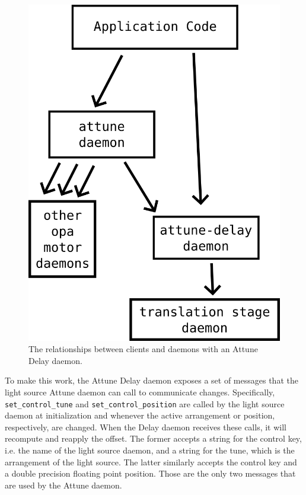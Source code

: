 \begin{figure}
\includegraphics[width=5in]{active_correction/images/attune_delay_flow}
\caption[Attune Delay Information Flow]{The relationships between clients and daemons with an Attune Delay daemon.}
\label{act_corr:fig:attune_delay_flow}
\end{figure}

To make this work, the Attune Delay daemon exposes a set of messages that the light source Attune daemon can call to communicate changes.
Specifically, \texttt{set\_control\_tune} and \texttt{set\_control\_position} are called by the light source daemon at initialization and whenever the active arrangement or position, respectively, are changed.
When the Delay daemon receives these calls, it will recompute and reapply the offset.
The former accepts a string for the control key, i.e. the name of the light source daemon, and a string for the tune, which is the arrangement of the light source.
The latter similarly accepts the control key and a double precision floating point position.
Those are the only two messages that are used by the Attune daemon.

